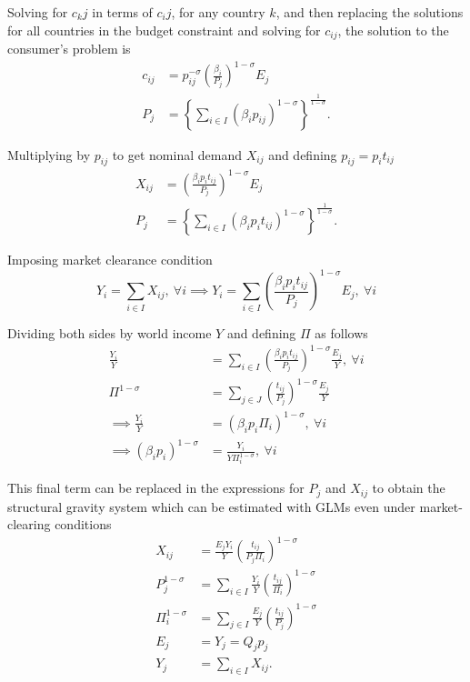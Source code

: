 \documentclass[12pt,reqno,oneside,pdftex]{formato-puc/puctesis} %
\begin{document}
Solving for \(c_kj\) in terms of \(c_ij\), for any country \(k\), and
then replacing the solutions for all countries in the budget constraint
and solving for \(c_{ij}\), the solution to the consumer's problem is
\begin{align*}
c_{ij} &= p_{ij}^{-\sigma} \left( \frac{\beta_i}{P_j} \right)^{1 - \sigma} E_j \\
P_j &= \left\{\sum_{i \in I} (\beta_i p_{ij})^{1 - \sigma} \right\}^{\frac{1}{1 - \sigma}}.
\end{align*}

Multiplying by \(p_{ij}\) to get nominal demand \(X_{ij}\) and defining
\(p_{ij} = p_i t_{ij}\) \begin{align*}
X_{ij} &= \left( \frac{\beta_i p_i t_{ij}}{P_j} \right)^{1 - \sigma} E_j \\
P_j &= \left\{\sum_{i \in I} (\beta_i p_{i} t_{ij})^{1 - \sigma} \right\}^{\frac{1}{1 - \sigma}}.
\end{align*}

Imposing market clearance condition \begin{equation*}
Y_i = \sum_{i \in I} X_{ij},\: \forall i \implies Y_i = \sum_{i \in I} \left( \frac{\beta_i p_i t_{ij}}{P_j} \right)^{1 - \sigma} E_j,\: \forall i
\end{equation*}

Dividing both sides by world income \(Y\) and defining \(\Pi\) as
follows \begin{align*}
\frac{Y_i}{Y} &= \sum_{i \in I} \left( \frac{\beta_i p_i t_{ij}}{P_j} \right)^{1 - \sigma} \frac{E_j}{Y},\: \forall i \\
\Pi^{1 - \sigma} &= \sum_{j \in J} \left(\frac{t_{ij}}{P_j}\right)^{1 - \sigma} \frac{E_j}{Y} \\
\implies \frac{Y_i}{Y} &= (\beta_i p_i \Pi_i)^{1 - \sigma},\: \forall i \\
\implies (\beta_i p_i)^{1 - \sigma} &= \frac{Y_i}{Y \Pi_i^{1 - \sigma}},\: \forall i
\end{align*}

This final term can be replaced in the expressions for \(P_j\) and
\(X_{ij}\) to obtain the structural gravity system which can be
estimated with GLMs even under market-clearing conditions \begin{align*}
X_{ij} &= \frac{E_j Y_i}{Y} \left( \frac{t_{ij}}{P_j \Pi_i} \right)^{1 - \sigma} \\
P_j^{1 - \sigma} &= \sum_{i \in I} \frac{Y_i}{Y} \left( \frac{t_{ij}}{\Pi_i} \right)^{1 - \sigma} \\
\Pi_i^{1 - \sigma} &= \sum_{j \in I} \frac{E_j}{Y} \left( \frac{t_{ij}}{P_j} \right)^{1 - \sigma} \\
E_j &= Y_j = Q_j p_j \\
Y_j &= \sum_{i \in I} X_{ij}.
\end{align*}
\end{document}
